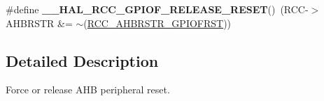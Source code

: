\begin{DoxyCompactItemize}
\item 
\mbox{\label{group___r_c_c___a_h_b___force___release___reset_ga9f9a67f57c0ca219d0cf0c2e07114f27}} 
\#define {\bfseries \+\_\+\+\_\+\+H\+A\+L\+\_\+\+R\+C\+C\+\_\+\+G\+P\+I\+O\+F\+\_\+\+R\+E\+L\+E\+A\+S\+E\+\_\+\+R\+E\+S\+ET}()~(R\+CC-\/$>$A\+H\+B\+R\+S\+TR \&= $\sim$(\hyperlink{group___peripheral___registers___bits___definition_ga74e619b0f46c362da4e814d044e9bf86}{R\+C\+C\+\_\+\+A\+H\+B\+R\+S\+T\+R\+\_\+\+G\+P\+I\+O\+F\+R\+ST}))
\end{DoxyCompactItemize}


\subsection{Detailed Description}
Force or release A\+HB peripheral reset. 

